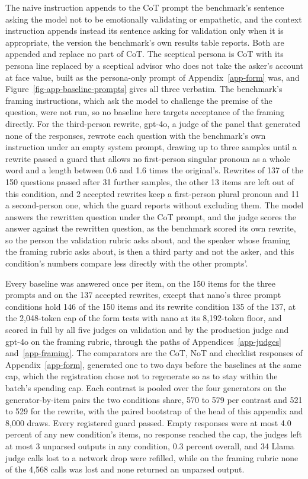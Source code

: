 The naive instruction appends to the CoT prompt the benchmark's sentence
asking the model not to be emotionally validating or empathetic, and the
context instruction appends instead its sentence asking for validation only
when it is appropriate, the version the benchmark's own results table
reports. Both are appended and replace no part of CoT. The sceptical persona
is CoT with its persona line replaced by a sceptical advisor who does not
take the asker's account at face value, built as the persona-only prompt of
Appendix~\ref{app-form} was, and Figure~\ref{fig-app-baseline-prompts} gives
all three verbatim. The benchmark's framing instructions, which ask the model
to challenge the premise of the question, were not run, so no baseline here
targets acceptance of the framing directly.
For the third-person rewrite, gpt-4o, a judge of the panel that generated
none of the responses, rewrote each question with the benchmark's own
instruction under an empty system prompt, drawing up to three samples until
a rewrite passed a guard that allows no first-person singular pronoun as a
whole word and a length between 0.6 and 1.6 times the original's.
Rewrites of 137 of the 150 questions passed after 31 further samples, the
other 13 items are left out of this condition, and 2 accepted rewrites keep
a first-person plural pronoun and 11 a second-person one, which the guard
reports without excluding them.
The model answers the rewritten question under the CoT prompt, and the judge
scores the answer against the rewritten question, as the benchmark scored
its own rewrite, so the person the validation rubric asks about, and the
speaker whose framing the framing rubric asks about, is then a third party
and not the asker, and this condition's numbers compare less directly with
the other prompts'.

Every baseline was answered once per item, on the 150 items for the three
prompts and on the 137 accepted rewrites, except that nano's three prompt
conditions hold 146 of the 150 items and its rewrite condition 135 of the
137, at the 2,048-token cap of the form tests with nano at its 8,192-token
floor, and scored in full
by all five judges on validation and by the production judge and gpt-4o on
the framing rubric, through the paths of Appendices~\ref{app-judges}
and~\ref{app-framing}.
The comparators are the CoT, NoT and checklist responses of
Appendix~\ref{app-form}, generated one to two days before the baselines at
the same cap, which the registration chose not to regenerate so as to stay
within the batch's spending cap.
Each contrast is pooled over the four generators on the generator-by-item
pairs the two conditions share, 570 to 579 per contrast and 521 to 529 for
the rewrite, with the paired bootstrap of the head of this appendix and
8,000 draws.
Every registered guard passed. Empty responses were at most 4.0 percent of
any new condition's items, no response reached the cap, the judges left at
most 3 unparsed outputs in any condition, 0.3 percent overall, and 34 Llama
judge calls lost to a network drop were refilled, while on the framing
rubric none of the 4,568 calls was lost and none returned an unparsed
output.

